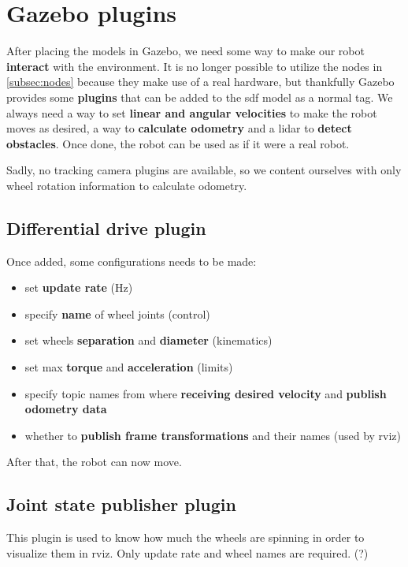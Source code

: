 \section{Gazebo plugins}

After placing the models in Gazebo, we need some way to make our robot \textbf{interact} with the environment. It is no longer possible to utilize the nodes in \autoref{subsec:nodes} because they make use of a real hardware, but thankfully Gazebo provides some \textbf{plugins} that can be added to the \acrshort{sdf} model as a normal tag.
We always need a way to set \textbf{linear and angular velocities} to make the robot moves as desired, a way to \textbf{calculate odometry} and a lidar to \textbf{detect obstacles}. Once done, the robot can be used as if it were a real robot.

Sadly, no tracking camera plugins are available, so we content ourselves with only wheel rotation information to calculate odometry. 

\subsection{Differential drive plugin}

Once added, some configurations needs to be made:
\begin{itemize}
    \item set \textbf{update rate} (Hz)
    \item specify \textbf{name} of wheel joints (control)
    \item set wheels \textbf{separation} and \textbf{diameter} (kinematics)
    \item set max \textbf{torque} and \textbf{acceleration} (limits)
    \item specify topic names from where \textbf{receiving desired velocity} and \textbf{publish odometry data}
    \item whether to \textbf{publish frame transformations} and their names (used by \acrshort{rviz})
\end{itemize}
After that, the robot can now move.

\subsection{Joint state publisher plugin} %

This plugin is used to know how much the wheels are spinning in order to visualize them in \acrshort{rviz}. Only update rate and wheel names are required. (?)

